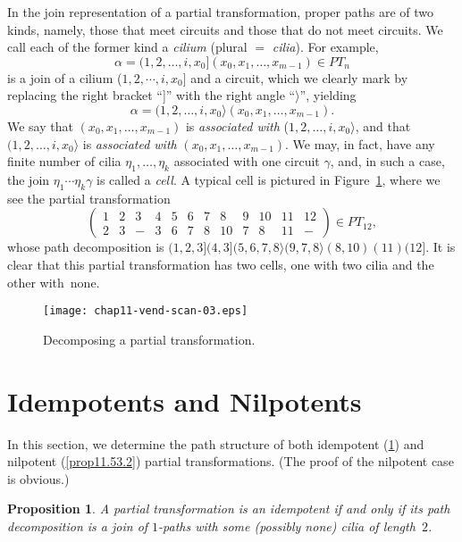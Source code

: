 \documentclass{surv-l}
\numberwithin{equation}{section}
\numberwithin{table}{section}
\numberwithin{figure}{section}
\newtheorem{proposition}[equation]{Proposition}
\theoremstyle{definition}
\begin{document}
In the join representation of a partial transformation, proper
paths are of two kinds, namely, those that meet circuits and those
that do not meet circuits. We call each of the former kind a
\emph{cilium} (plural $=$
\emph{cilia}). For example,
\[
\alpha=(1,2,\ldots, i, x_{0}](x_{0}, x_{1},\ldots, x_{m-1})\in PT_{n}
\]
is a join of a cilium ($1,2,\cdots, i, x_{0}]$ and a circuit,
which we clearly mark by replacing the right bracket ``]'' with
the right angle ``$\rangle$'', yielding
\[
\alpha=(1,2,\ldots, i, x_{0}\rangle(x_{0}, x_{1},\ldots, x_{m-1}).
\]
We say that $(x_{0}, x_{1},\ldots, x_{m-1})$ is \emph{associated
with} ($1, 2,\ldots, i, x_{0}\rangle$, and that\break $(1, 2,\ldots, i,
x_{0}\rangle$ is \emph{associated with} $(x_{0}, x_{1},\ldots,
x_{m-1})$. We may, in fact, have any finite number of cilia
$\eta_{1},\ldots, \eta_{k}$ associated with one circuit $\gamma$,
and, in such a case, the join $\eta_{1}\cdots\eta_{k}\gamma$ is
called a \emph{cell}. A typical cell is pictured in
Figure~\ref{fig11.52.1}, where we see the partial transformation
\[
\left(\begin{array}{cccccccccccc}
1 & 2 & 3 & 4 & 5 & 6 & 7 & 8 & 9 & 10 & 11 & 12\\
2 & 3 & - & 3 & 6 & 7 & 8 & 10 & 7 & 8 & 11 & -
\end{array}\right)\in PT_{12},
\]
whose path decomposition is $(1,
2,3](4,3](5,6,7,8\rangle(9,7,8\rangle(8,10)(11)(12]$. It is clear
that this partial transformation has two cells, one with two cilia
and the other with~none.

\begin{figure}[!h]
\texttt{[image: chap11-vend-scan-03.eps]}
\caption{Decomposing a partial transformation.\label{fig11.52.1}}
\end{figure}

\section{Idempotents and Nilpotents}\label{sec11.53}

In this section, we determine the path structure of both
idempotent (\ref{prop11.53.1}) and nilpotent (\ref{prop11.53.2})
partial transformations. (The proof of the nilpotent case is
obvious.)

\begin{proposition}\label{prop11.53.1}
A partial transformation is an idempotent if and only if its path
decomposition is a join of $1$-paths with some (possibly none) cilia
of length~$2$.
\end{proposition}
\end{document}
